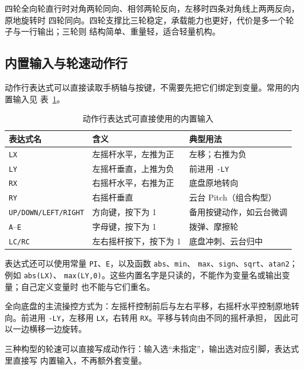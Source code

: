 四轮全向轮直行时对角两轮同向、相邻两轮反向，左移时四条对角线上两两反向，原地旋转时
四轮同向。四轮支撑比三轮稳定，承载能力也更好，代价是多一个轮子与一行输出；三轮则
结构简单、重量轻，适合轻量机构。

\subsection{内置输入与轮速动作行}
\label{sec:concise-wheel-rows}

动作行表达式可以直接读取手柄轴与按键，不需要先把它们绑定到变量。常用的内置输入见
表~\ref{tab:concise-builtin-inputs}。

\begin{table}[htbp]
  \centering
  \small
  \begin{tabularx}{\linewidth}{@{}l l X@{}}
    \toprule
    表达式名 & 含义 & 典型用法 \\
    \midrule
    \texttt{LX} & 左摇杆水平，左推为正 & 左移；右推为负 \\
    \texttt{LY} & 左摇杆垂直，上推为负 & 前进用 \texttt{-LY} \\
    \texttt{RX} & 右摇杆水平，右推为正 & 底盘原地转向 \\
    \texttt{RY} & 右摇杆垂直 & 云台 Pitch（组合构型） \\
    \texttt{UP/DOWN/LEFT/RIGHT} & 方向键，按下为 1 & 备用按键动作，如云台微调 \\
    \texttt{A}--\texttt{E} & 字母键，按下为 1 & 拨弹、摩擦轮 \\
    \texttt{LC/RC} & 左右摇杆按下，按下为 1 & 底盘冲刺、云台归中 \\
    \bottomrule
  \end{tabularx}
  \caption{动作行表达式可直接使用的内置输入}
  \label{tab:concise-builtin-inputs}
\end{table}

表达式还可以使用常量 \texttt{PI}、\texttt{E}，以及函数 \texttt{abs}、\texttt{min}、
\texttt{max}、\texttt{sign}、\texttt{sqrt}、\texttt{atan2}；例如 \texttt{abs(LX)}、
\texttt{max(LY,0)}。这些内置名字是只读的，不能作为变量名或输出变量；自己定义变量时
也不能与它们重名。

全向底盘的主流操控方式为：左摇杆控制前后与左右平移，右摇杆水平控制原地转向。前进用
\texttt{-LY}，左移用 \texttt{LX}，右转用 \texttt{RX}。平移与转向由不同的摇杆承担，
因此可以一边横移一边旋转。

三种构型的轮速可以直接写成动作行：输入选“未指定”，输出选对应引脚，表达式里直接写
内置输入，不再额外套变量。

